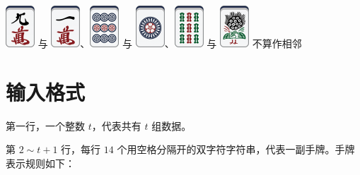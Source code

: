 \documentclass{../cpct/ctpro}
\begin{document}
\begin{remark}
\begin{itemize}
              \includegraphics[scale=0.5]{images/mahjong/9m.png} 与 \includegraphics[scale=0.5]{images/mahjong/1m.png}、\includegraphics[scale=0.5]{images/mahjong/9p.png} 与 \includegraphics[scale=0.5]{images/mahjong/1p.png}、\includegraphics[scale=0.5]{images/mahjong/9s.png} 与 \includegraphics[scale=0.5]{images/mahjong/1s.png} 不算作相邻
    \end{itemize}
\end{remark}

\section*{输入格式}

第一行，一个整数 $t$，代表共有 $t$ 组数据。

第 $2 \sim t+1$ 行，每行 $14$ 个用空格分隔开的双字符字符串，代表一副手牌。手牌表示规则如下：
\end{document}
